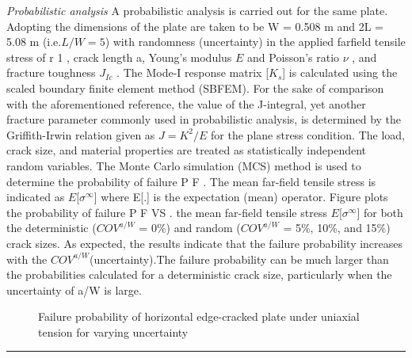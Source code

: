 \documentclass[12pt]{article}
\begin{document}
{\it Probabilistic analysis } A probabilistic analysis is carried out for the same plate. Adopting the dimensions of the plate
are taken to be W = 0.508 m  and 2L = 5.08 m  (i.e.$L/W = 5$) with randomness (uncertainty) in the applied farfield
 tensile stress of r 1 , crack length a, Young’s modulus $E$ and Poisson’s ratio $\nu$ , and fracture toughness $J_{Ic}$ . The Mode-I response 
 matrix [$K_s $] is calculated using the scaled boundary finite element method (SBFEM). For the sake of comparison with
the aforementioned reference, the value of the J-integral, yet another fracture parameter commonly used in probabilistic
analysis, is determined by the Griffith-Irwin relation given as $J = K^2 /E$ for the plane stress condition. The load, crack size,
and material properties are treated as statistically independent random variables. The Monte Carlo simulation (MCS)
method is used to determine the probability of failure P F . The mean far-field tensile stress is indicated as $E[\sigma^\infty$] where E[.] is
the expectation (mean) operator. Figure plots the probability of failure P F VS . the mean far-field tensile stress $E[\sigma^\infty$] for both
the deterministic ($COV^{a/W}$ = 0\%) and random ($COV^{a/W}$ = 5\%, 10\%, and 15\%) crack sizes. As expected, the results indicate that the
failure probability increases with the $COV^{a/W}$(uncertainty).The failure probability can be much larger than the probabilities
calculated for a deterministic crack size, particularly when the uncertainty of a/W is large.
\begin{figure}[H]
    \centering
    \captionsetup{labelformat=empty}
    \caption{Failure probability of horizontal edge-cracked plate under uniaxial tension for varying uncertainty}  
\end{figure}


\rule{\textwidth}{.1em}
\end{document}
